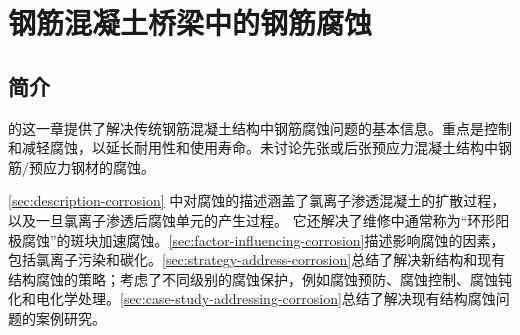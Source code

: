 \chapter{钢筋混凝土桥梁中的钢筋腐蚀}\label{chp:corrosion-of-steel-rc-bridge}
\section{简介}
的这一章提供了解决传统钢筋混凝土结构中钢筋腐蚀问题的基本信息。重点是控制和减轻腐蚀，以延长耐用性和使用寿命。未讨论先张或后张预应力混凝土结构中钢筋/预应力钢材的腐蚀。

\cref{sec:description-corrosion} 中对腐蚀的描述涵盖了氯离子渗透混凝土的扩散过程，以及一旦氯离子渗透后腐蚀单元的产生过程。 它还解决了维修中通常称为“环形阳极腐蚀”的斑块加速腐蚀。\cref{sec:factor-influencing-corrosion}描述影响腐蚀的因素，包括氯离子污染和碳化。\cref{sec:strategy-address-corrosion}总结了解决新结构和现有结构腐蚀的策略；考虑了不同级别的腐蚀保护，例如腐蚀预防、腐蚀控制、腐蚀钝化和电化学处理。\cref{sec:case-study-addressing-corrosion}总结了解决现有结构腐蚀问题的案例研究。


